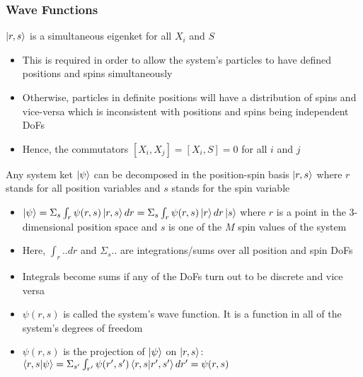 \documentclass[8pt,t,mathserif,aspectratio=169]{beamer}
\begin{document}
\begin{frame}
  \frametitle{Wave Functions}
  \vspace{1mm}
  $\ket{r,s}$ is a simultaneous eigenket for all $X_i$ and $S$
  \begin{itemize}
    \item This is required in order to allow the system's particles to have defined positions and spins simultaneously
    \item Otherwise, particles in definite positions will have a distribution of spins and vice-versa which is inconsistent with positions and spins being independent DoFs
    \item Hence, the commutators $[X_i,X_j] = [X_i,S] = 0$ for all $i$ and $j$
  \end{itemize}
  Any system ket $\ket{\psi}$ can be decomposed in the position-spin basis $\ket{r,s}$ where $r$ stands for all position variables and $s$ stands for the spin variable
  \begin{itemize}
    \item $\ket{\psi} = \Sigma_s \int_r \psi(r,s) \ket{r,s} dr = \Sigma_s \int_r \psi(r,s) \ket{r} dr \ket{s}$ where $r$ is a point in the $3$-dimensional position space and $s$ is one of the $M$ spin values of the system
    \item Here, $\int_r .. dr$ and $\Sigma_s .. $ are integrations/sums over all position and spin DoFs
    \item Integrals become sums if any of the DoFs turn out to be discrete and vice versa
    \item $\psi(r,s)$ is called the system's wave function. It is a function in all of the system's degrees of freedom
    \item $\psi(r,s)$ is the projection of $\ket{\psi}$ on $\ket{r,s}$: $\braket{r,s}{\psi} = \Sigma_{s'}\int_{r'} \psi(r',s') \braket{r,s}{r',s'} dr' = \psi(r,s)$
  \end{itemize}
\end{frame}
\end{document}
